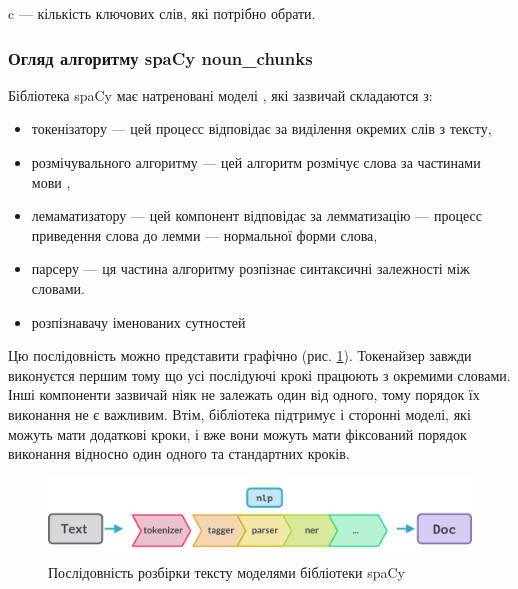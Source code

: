 \documentclass[14pt]{extarticle}
\begin{document}
  c --- кількість ключових слів, які потрібно обрати.

  \subsubsection{Огляд алгоритму spaCy noun\_chunks}
  Бібліотека spaCy має натреновані моделі \cite{spacy_models,spacy_pipelines},
  які зазвичай складаются з:
  \begin{itemize}[labelindent=\dimexpr{}\relax, leftmargin=*]
    \item токенізатору \cite{wiki_tokenizer,spacy_tokenizer} ---
      цей процесс відповідає за виділення окремих слів з тексту,
    \item розмічувального алгоритму \cite{spacy_tagger} ---
      цей алгоритм розмічує слова за частинами мови \cite{wiki_pos_tagging},
    \item лемаматизатору \cite{spacy_lemmatizer} ---
      цей компонент відповідає за лемматизацію \cite{wiki_lemmatization} ---
      процесс приведення слова до лемми \cite{wiki_lemma} ---
      нормальної форми слова,
    \item парсеру \cite{spacy_dependency_parser} --- ця частина алгоритму розпізнає синтаксичні
    залежності між словами.
    \item розпізнавачу іменованих сутностей \cite{wiki_ner, spacy_er}
  \end{itemize}

  Цю послідовність можно представити графічно (рис. \ref{fig:spacy_pipeline}).
  Токенайзер завжди виконуєтся першим
  тому що усі послідуючі крокі працюють з окремими словами.
  Інші компоненти зазвичай ніяк не залежать один від одного,
  тому порядок їх виконання не є важливим. Втім,
  бібліотека підтримує і сторонні моделі, які можуть мати додаткові кроки,
  і вже вони можуть мати фіксований порядок виконання відносно один одного
  та стандартних кроків.

  \begin{figure}[H]
    \centering
    \includegraphics[width=\textwidth]{spacy_pipeline.png}    
    \captionsetup{justification=centering}  
    \caption{Послідовність розбірки тексту моделями бібліотеки spaCy}
    \label{fig:spacy_pipeline}
  \end{figure}
\end{document}
